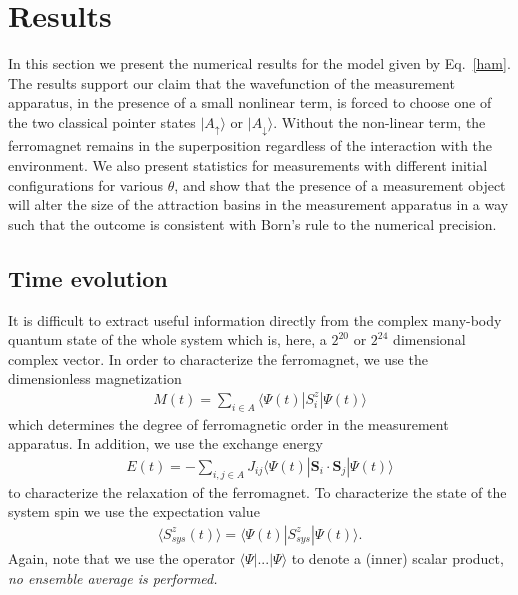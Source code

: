 \documentclass[showpacs,preprintnumbers,amsmath,amssymb,12pt]{revtex4-2}
\begin{document}
\section{Results}
In this section we present the numerical results for the model given
by Eq.~\eqref{ham}. The results support our claim that the
wavefunction of the measurement apparatus, in the presence of a small
nonlinear term, is forced to choose one of the two classical pointer
states $|A_{\uparrow} \rangle$ or $|A_{\downarrow} \rangle$.  Without
the non-linear term, the ferromagnet remains in the superposition
regardless of the interaction with the environment. We also present
statistics for measurements with different initial configurations for
various $\theta$, and show that the presence of a measurement object
will alter the size of the attraction basins in the measurement
apparatus in a way such that the outcome is consistent with Born's
rule to the numerical precision.

\subsection{Time evolution}
It is difficult to extract useful information directly from the
complex many-body quantum state of the whole system which is, here, a
$2^{20}$ or $2^{24}$ dimensional complex vector. In order to
characterize the ferromagnet, we use the dimensionless magnetization
\begin{eqnarray}
  M(t) = \sum_{i\in A} \langle \Psi(t) | S_i^z | \Psi(t)\rangle
\end{eqnarray}
which determines the degree of ferromagnetic order in the measurement
apparatus. In addition, we use the exchange energy
\begin{eqnarray}
  E(t) = - \sum_{i,j\in A} J_{ij}\langle\Psi(t)|
  \boldsymbol{S}_i \cdot \boldsymbol{S}_j | \Psi(t)  \rangle
\end{eqnarray}
to characterize the relaxation of the ferromagnet. To characterize the
state of the system spin we use the expectation value
\begin{eqnarray}
  \langle S_{sys}^z(t) \rangle = \langle \Psi(t) | S_{sys}^z | \Psi(t) \rangle.
\end{eqnarray}
Again, note that we use the operator $\langle \Psi |...| \Psi \rangle$
to denote a (inner) scalar product, {\em no ensemble average is
  performed.}
\end{document}
